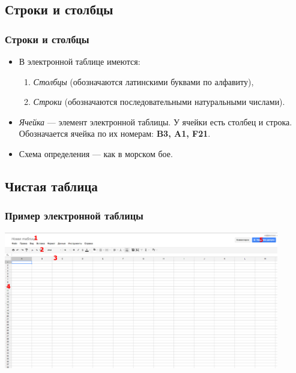 \documentclass[compress,red]{beamer}
\begin{document}
\subsection{Строки и столбцы}
\begin{frame}[fragile]
  \frametitle{Строки и столбцы}
  \begin{itemize}
    \item В электронной таблице имеются:
        \begin{enumerate}
            \item \emph{Столбцы} (обозначаются латинскими буквами по алфавиту),
            \item \emph{Строки} (обозначаются последовательными натуральными числами).
        \end{enumerate}
    \item \emph{Ячейка} --- элемент электронной таблицы. У ячейки есть столбец и строка. Обозначается ячейка по их номерам: \textbf{B3, A1, F21}.
    \item Схема определения --- как в морском бое.
  \end{itemize}
\end{frame}

\subsection{Чистая таблица}
\begin{frame}[fragile]
  \frametitle{Пример электронной таблицы}
  \centerline{\includegraphics[width=0.9\textwidth]{images/02.png}}
\end{frame}
\end{document}
